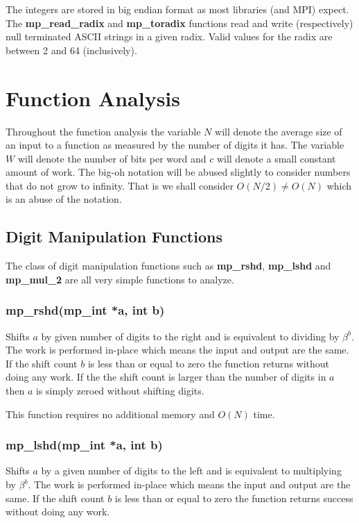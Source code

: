 \documentclass{article}
\begin{document}
The integers are stored in big endian format as most libraries (and MPI) expect.  The \textbf{mp\_read\_radix} and 
\textbf{mp\_toradix} functions read and write (respectively) null terminated ASCII strings in a given radix.  Valid values
for the radix are between 2 and 64 (inclusively).  

\section{Function Analysis}

Throughout the function analysis the variable $N$ will denote the average size of an input to a function as measured 
by the number of digits it has.  The variable $W$ will denote the number of bits per word and $c$ will denote a small
constant amount of work.  The big-oh notation will be abused slightly to consider numbers that do not grow to infinity.
That is we shall consider $O(N/2) \ne O(N)$ which is an abuse of the notation.

\subsection{Digit Manipulation Functions}
The class of digit manipulation functions such as \textbf{mp\_rshd}, \textbf{mp\_lshd} and \textbf{mp\_mul\_2} are all
very simple functions to analyze.  

\subsubsection{mp\_rshd(mp\_int *a, int b)}
Shifts $a$ by given number of digits to the right and is equivalent to dividing by $\beta^b$.  The work is performed
in-place which means the input and output are the same.  If the shift count $b$ is less than or equal to zero 
the function returns without doing any work.  If the the shift count is larger than the number of digits in $a$ 
then $a$ is simply zeroed without shifting digits.

This function requires no additional memory and $O(N)$ time.

\subsubsection{mp\_lshd(mp\_int *a, int b)}
Shifts $a$ by a given number of digits to the left and is equivalent to multiplying by $\beta^b$.  The work
is performed in-place which means the input and output are the same.  If the shift count $b$ is less than or equal 
to zero the function returns success without doing any work.
\end{document}
